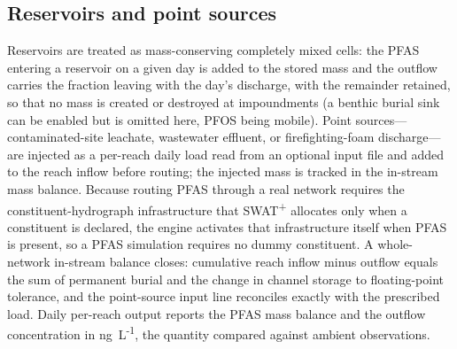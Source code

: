 \subsection{Reservoirs and point sources}
Reservoirs are treated as mass-conserving completely mixed cells: the PFAS entering a reservoir on a given day is added to the stored mass and the outflow carries the fraction leaving with the day's discharge, with the remainder retained, so that no mass is created or destroyed at impoundments (a benthic burial sink can be enabled but is omitted here, PFOS being mobile). Point sources---contaminated-site leachate, wastewater effluent, or firefighting-foam discharge---are injected as a per-reach daily load read from an optional input file and added to the reach inflow before routing; the injected mass is tracked in the in-stream mass balance. Because routing PFAS through a real network requires the constituent-hydrograph infrastructure that SWAT\textsuperscript{+} allocates only when a constituent is declared, the engine activates that infrastructure itself when PFAS is present, so a PFAS simulation requires no dummy constituent. A whole-network in-stream balance closes: cumulative reach inflow minus outflow equals the sum of permanent burial and the change in channel storage to floating-point tolerance, and the point-source input line reconciles exactly with the prescribed load. Daily per-reach output reports the PFAS mass balance and the outflow concentration in ng~L\textsuperscript{-1}, the quantity compared against ambient observations.
